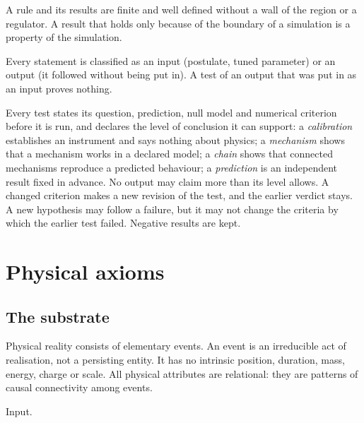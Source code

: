\begin{definition}[M5: Finiteness]
A rule and its results are finite and well defined without a wall of the region or a regulator. A
result that holds only because of the boundary of a simulation is a property of the simulation.
\end{definition}

\begin{definition}
Every statement is classified as an input (postulate, tuned parameter) or an output (it followed
without being put in). A test of an output that was put in as an input proves nothing.
\end{definition}

\begin{definition}
Every test states its question, prediction, null model and numerical criterion before it is run,
and declares the level of conclusion it can support: a \emph{calibration} establishes an instrument and
says nothing about physics; a \emph{mechanism} shows that a mechanism works in a declared model; a
\emph{chain} shows that connected mechanisms reproduce a predicted behaviour; a \emph{prediction} is an
independent result fixed in advance. No output may claim more than its level allows. A changed criterion
makes a new revision of the test, and the earlier verdict stays. A new hypothesis may follow a failure, but
it may not change the criteria by which the earlier test failed. Negative results are kept.
\end{definition}

\section{Physical axioms}\label{sec:phys-ax}

\subsection{The substrate}

\begin{axiom}\label{ax:events}
Physical reality consists of elementary events. An event is an irreducible act of realisation, not a
persisting entity. It has no intrinsic position, duration, mass, energy, charge or scale. All
physical attributes are relational: they are patterns of causal connectivity among events.
\end{axiom}
\begin{status} Input. \end{status}

